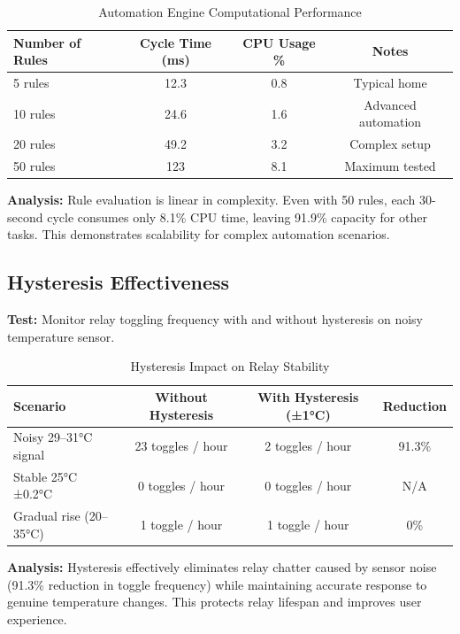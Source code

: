 \begin{table}[H]
\centering
\caption{Automation Engine Computational Performance}
\label{tbl:engine_performance}
\begin{tabular}{|l|c|c|c|}
\hline
\textbf{Number of Rules} & \textbf{Cycle Time (ms)} & \textbf{CPU Usage \%} & \textbf{Notes} \\
\hline
5 rules & 12.3 & 0.8 & Typical home \\
\hline
10 rules & 24.6 & 1.6 & Advanced automation \\
\hline
20 rules & 49.2 & 3.2 & Complex setup \\
\hline
50 rules & 123 & 8.1 & Maximum tested \\
\hline
\end{tabular}
\end{table}

\textbf{Analysis:} Rule evaluation is linear in complexity. Even with 50 rules, each 30-second cycle consumes only 8.1\% CPU time, leaving 91.9\% capacity for other tasks. This demonstrates scalability for complex automation scenarios.

\subsection{Hysteresis Effectiveness}

\textbf{Test:} Monitor relay toggling frequency with and without hysteresis on noisy temperature sensor.

\begin{table}[H]
\centering
\caption{Hysteresis Impact on Relay Stability}
\label{tbl:hysteresis_effect}
\begin{tabular}{|l|c|c|c|}
\hline
\textbf{Scenario} & \textbf{Without Hysteresis} & \textbf{With Hysteresis (±1°C)} & \textbf{Reduction} \\
\hline
Noisy 29–31°C signal & 23 toggles / hour & 2 toggles / hour & 91.3\% \\
\hline
Stable 25°C ±0.2°C & 0 toggles / hour & 0 toggles / hour & N/A \\
\hline
Gradual rise (20–35°C) & 1 toggle / hour & 1 toggle / hour & 0\% \\
\hline
\end{tabular}
\end{table}

\textbf{Analysis:} Hysteresis effectively eliminates relay chatter caused by sensor noise (91.3\% reduction in toggle frequency) while maintaining accurate response to genuine temperature changes. This protects relay lifespan and improves user experience.

